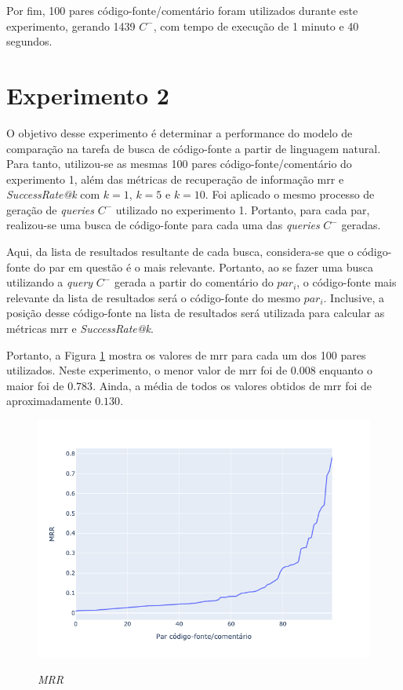 Por fim, 100 pares código-fonte/comentário foram utilizados durante este experimento, gerando 1439 $C^-$, com tempo de execução de 1 minuto e 40 segundos.

\section{Experimento 2} 
\label{sec:results:experiment-2}
O objetivo desse experimento é determinar a performance do modelo de comparação na tarefa de busca de código-fonte a partir de linguagem natural. Para tanto, utilizou-se as mesmas 100 pares código-fonte/comentário do experimento 1, além das métricas de recuperação de informação \gls{mrr} e \textit{SuccessRate@k} com $k=1$, $k=5$ e $k=10$. Foi aplicado o mesmo processo de geração de \textit{queries} $C^-$ utilizado no experimento 1. Portanto, para cada par, realizou-se uma busca de código-fonte para cada uma das \textit{queries} $C^-$ geradas. 

Aqui, da lista de resultados resultante de cada busca, considera-se que o código-fonte do par em questão é o mais relevante. Portanto, ao se fazer uma busca utilizando a \textit{query} $C^-$ gerada a partir do comentário do $par_i$, o código-fonte mais relevante da lista de resultados será o código-fonte do mesmo $par_i$. Inclusive, a posição desse código-fonte na lista de resultados será utilizada para calcular as métricas \gls{mrr} e \textit{SuccessRate@k}.

Portanto, a Figura \ref{fig:experiment-2-mrr} mostra os valores de \gls{mrr} para cada um dos 100 pares utilizados. Neste experimento, o menor valor de \gls{mrr} foi de $0.008$ enquanto o maior foi de $0.783$. Ainda, a média de todos os valores obtidos de \gls{mrr} foi de aproximadamente $0.130$.

\begin{figure}[H]
  \centering
      \caption{\textit{MRR}}
      \includegraphics[scale=0.6]{imagens/resultados/experiment-2/mrr.png}
      \label{fig:experiment-2-mrr}
\end{figure}


